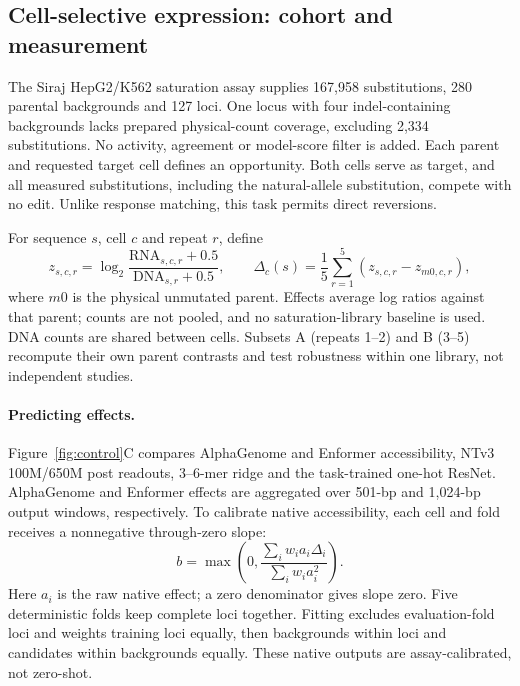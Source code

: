 \subsection{Cell-selective expression: cohort and measurement}
\label{app:cell-selective}
The Siraj HepG2/K562 saturation assay \citep{siraj2026functional} supplies
167,958 substitutions, 280 parental backgrounds and 127 loci. One locus with
four indel-containing backgrounds lacks prepared physical-count coverage, excluding 2,334
substitutions. No activity, agreement or model-score filter is added.
Each parent and requested target cell defines an opportunity. Both cells serve
as target, and all measured substitutions, including the natural-allele
substitution, compete with no edit. Unlike response matching, this task permits
direct reversions.

For sequence $s$, cell $c$ and repeat $r$, define
\begin{equation}
 z_{s,c,r}=\log_2\frac{\mathrm{RNA}_{s,c,r}+0.5}{\mathrm{DNA}_{s,r}+0.5},
 \qquad
 \Delta_c(s)=\frac{1}{5}\sum_{r=1}^{5}(z_{s,c,r}-z_{m0,c,r}),
\end{equation}
where $m0$ is the physical unmutated parent. Effects average log ratios against
that parent; counts are not pooled, and no saturation-library baseline is used.
DNA counts are shared between cells.
Subsets A (repeats 1--2) and B (3--5) recompute their own parent contrasts and
test robustness within one library, not independent studies.

\paragraph[Predicting effects.]{\label{app:cell-selective-fitting}Predicting effects.}
Figure~\ref{fig:control}C compares AlphaGenome and Enformer accessibility,
NTv3 100M/650M post readouts, 3--6-mer ridge and the task-trained one-hot ResNet.
AlphaGenome and Enformer effects are aggregated over 501-bp and 1,024-bp output windows, respectively. To calibrate native
accessibility, each cell and fold receives a nonnegative through-zero slope:
\begin{equation}
 b=\max\!\left(0,\frac{\sum_i w_i a_i\Delta_i}{\sum_i w_i a_i^2}\right).
\end{equation}
Here $a_i$ is the raw native effect; a zero denominator gives slope zero.
Five deterministic folds keep complete loci together.
Fitting excludes evaluation-fold loci and weights training loci equally, then
backgrounds within loci and candidates within backgrounds equally. These native outputs are
assay-calibrated, not zero-shot.

